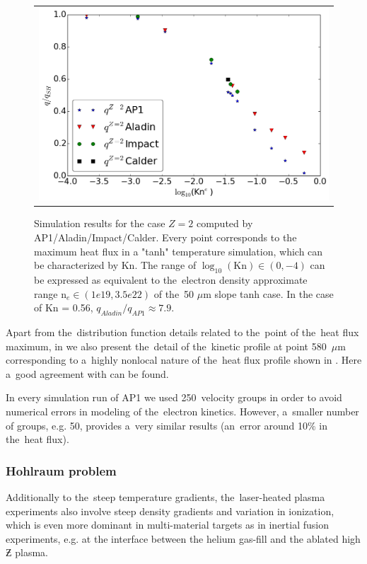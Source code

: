 \begin{figure}[tbh]
  \begin{center}
    \begin{tabular}{c}
      \includegraphics[width=\figscale\textwidth]{Kn_results.png}
    \end{tabular}
  \caption{  
  Simulation results for the case $Z=2$ computed by AP1/Aladin/Impact/Calder.
  Every point corresponds to the maximum heat flux in a "tanh" temperature 
  simulation, which can be characterized by Kn. The range of 
  $\log_{10}(\text{Kn})\in (0, -4)$ can be expressed as equivalent 
  to the~electron density approximate range n$_e \in (1e19, 3.5e22)$ of 
  the~50 $\mu$m slope tanh case. In the case of Kn = 0.56, 
  $q_{Aladin} / q_{AP1}\approx 7.9$.}
  \label{fig:Kn_results}
  \end{center} 
\end{figure}

Apart from the~distribution function details related to the~point of 
the~heat flux maximum, in 
we also present the~detail of the~kinetic profile at point 580~$\mu$m 
corresponding to a~highly nonlocal nature of the~heat flux profile shown in
. Here a~good agreement with
\cite{Sherlock_PoP2017} can be found.

In every simulation run of AP1 we used 250~velocity groups in order to avoid
numerical errors in modeling of the~electron kinetics. However, a~smaller 
number of groups, e.g. 50, provides a~very similar results 
(an~error around 10$\%$ in the~heat flux).

\subsubsection{Hohlraum problem}
Additionally to the~steep temperature gradients, the~laser-heated plasma 
experiments also involve steep density gradients and variation in ionization,
which is even more dominant in multi-material targets as in inertial
fusion experiments, e.g. at the interface between the helium gas-fill and 
the ablated high $\Zbar$ plasma.

